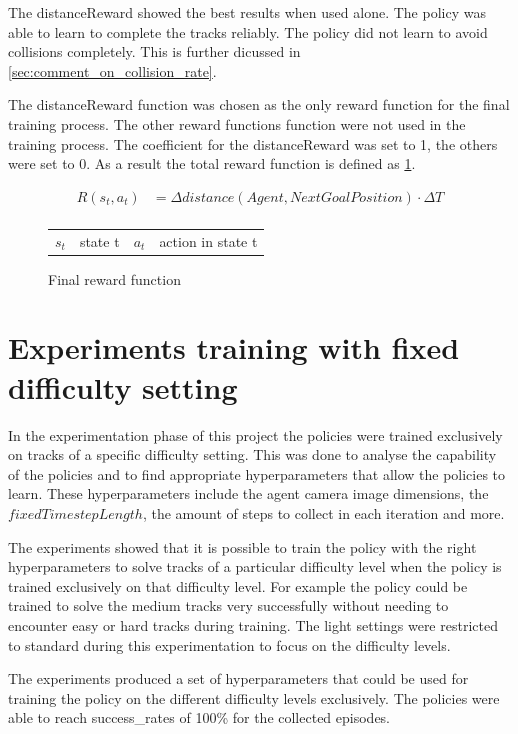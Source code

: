 The distanceReward showed the best results when used alone. The policy was able to learn to complete the tracks reliably. The policy did not learn to avoid collisions completely. This is further dicussed in \ref{sec:comment_on_collision_rate}.

The distanceReward function was chosen as the only reward function for the final training process. The other reward functions function were not used in the training process.
The coefficient for the distanceReward was set to 1, the others were set to 0. As a result the total reward function is defined as \ref{fig:final_reward_function}.

\begin{figure}
    \centering
    \begin{align*}
        R(s_t,a_t) & = \Delta distance(Agent, NextGoalPosition) \cdot \Delta T \nonumber \\
    \end{align*}
    \caption{Final reward function}
    \begin{tabular}{r@{: }l r@{: }l}
        $s_t$ & state t & $a_t$ & action in state t
    \end{tabular}
    \label{fig:final_reward_function}
\end{figure}


\section{Experiments training with fixed difficulty setting}
\label{cha:experiment_fixed_difficulty}

In the experimentation phase of this project the policies were trained exclusively on tracks of a specific difficulty setting. This was done to analyse the capability of the policies and to find appropriate hyperparameters that allow the policies to learn. These hyperparameters include the agent camera image dimensions, the $fixedTimestepLength$, the amount of steps to collect in each iteration and more.

The experiments showed that it is possible to train the policy with the right hyperparameters to solve tracks of a particular difficulty level when the policy is trained exclusively on that difficulty level. For example the policy could be trained to solve the medium tracks very successfully without needing to encounter easy or hard tracks during training. The light settings were restricted to standard during this experimentation to focus on the difficulty levels.

The experiments produced a set of hyperparameters that could be used for training the policy on the different difficulty levels exclusively. The policies were able to reach success\_rates of 100\% for the collected episodes.

